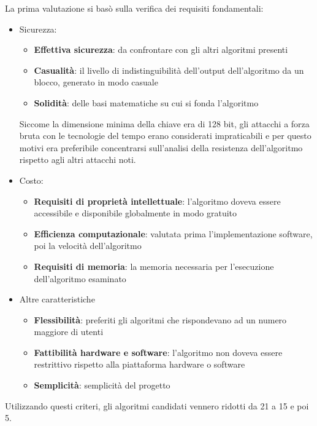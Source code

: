 \documentclass[a4paper,11pt]{article}
\begin{document}
La prima valutazione si basò sulla verifica dei requisiti fondamentali:
\begin{itemize}
    \item Sicurezza:
    \begin{itemize}
        \item \textbf{Effettiva sicurezza}: da confrontare con gli altri algoritmi presenti
        \item \textbf{Casualità}: il livello di indistinguibilità dell'output dell'algoritmo da un blocco, generato in modo casuale
        \item \textbf{Solidità}: delle basi matematiche su cui si fonda l'algoritmo 
    \end{itemize}
    Siccome la dimensione minima della chiave era di 128 bit, gli attacchi a forza bruta con le tecnologie del tempo erano considerati impraticabili e per questo motivi era preferibile concentrarsi sull'analisi della resistenza dell'algoritmo rispetto agli altri attacchi noti.
    \item Costo: 
    \begin{itemize}
        \item \textbf{Requisiti di proprietà intellettuale}: l'algoritmo doveva essere accessibile e disponibile globalmente in modo gratuito
        \item \textbf{Efficienza computazionale}: valutata prima l'implementazione software, poi la velocità dell'algoritmo
        \item \textbf{Requisiti di memoria}: la memoria necessaria per l'esecuzione dell'algoritmo esaminato
    \end{itemize}
    \item Altre caratteristiche
    \begin{itemize}
        \item \textbf{Flessibilità}: preferiti gli algoritmi che rispondevano ad un numero maggiore di utenti
        \item \textbf{Fattibilità hardware e software}: l'algoritmo non doveva essere restrittivo rispetto alla piattaforma hardware o software
        \item \textbf{Semplicità}: semplicità del progetto
    \end{itemize}
\end{itemize}

Utilizzando questi criteri, gli algoritmi candidati vennero ridotti da 21 a 15 e poi 5.
\end{document}
